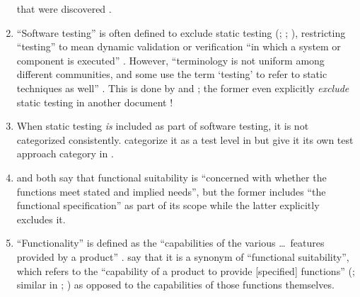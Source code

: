 \begin{enumerate}
          that were discovered \citep[p.~427]{vanVliet2000}.
    \item %
          ``Software testing'' is often defined to exclude static testing
          (\citealp[p.~13]{Firesmith2015}; \citealp[p.~222]{AmmannAndOffutt2017};
          \citealp[p.~439]{PetersAndPedrycz2000}), restricting ``testing'' to
          mean dynamic validation \citep[p.~5\=/1]{SWEBOK2024} or verification
          ``in which a system or component is executed'' \citep[p.~427]{IEEE2017}.
          However, ``terminology is not uniform among different communities, and
          some use the term `testing' to refer to static techniques%
           as well'' \citep[p.~5\=/2]{SWEBOK2024}.
          This is done by \citet[pp.~16\==17]{IEEE2022} and
          \citet[pp.~8\==9]{Gerrard2000a}; the former even explicitly
          \emph{exclude} static testing in another
          document \citeyearpar[p.~440]{IEEE2017}!
    \item %
          When static testing \emph{is} included as part of software testing,
          it is not categorized consistently. \citeauthor{IEEE2021b} categorize
          it as a test level in \citeyearpar[p.~43]{IEEE2021b} but give it its
          own test approach category in \citeyearpar[p.~10, 23, Fig.~2]{IEEE2022}.
    \item %
          \citet{ISO_IEC2023a} and \citet[p.~196]{IEEE2017} both say that
          functional suitability is ``concerned with whether the functions meet
          stated and implied needs'', but the former includes ``the functional
          specification'' as part of its scope while the latter explicitly
          excludes it.
    \item %
          ``Functionality'' is defined as the ``capabilities of the various
          \dots\ features provided by a product'' \citep[p.~196]{IEEE2017}.
          \citetISTQB{} say that it is a synonym of ``functional suitability'',
          which refers to the ``capability of a product to provide [specified]
          functions'' (\citealp{ISO_IEC2023a}; similar in
          \citealp[p.~196]{IEEE2017}; \citealpISTQB{}) as opposed to the
          capabilities of those functions themselves.

\end{enumerate}

